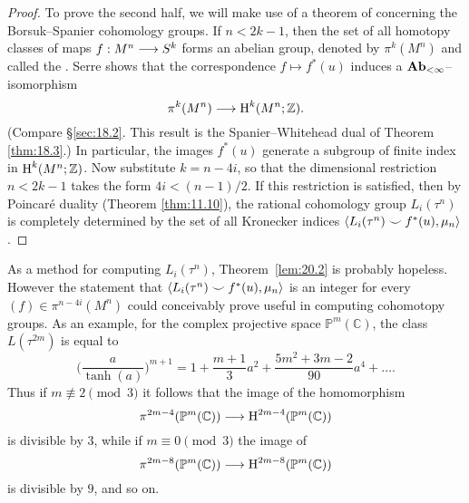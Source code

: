 \documentclass[../main]{subfiles}
\begin{document}
\begin{proof}
To prove the second half, we will make use of a theorem of \cite[p. 289]{serre} concerning the Borsuk--Spanier cohomology groups. If $n < 2 k - 1$, then the set of all homotopy classes of maps $f : M^n \longrightarrow S^k$ forms an abelian group, denoted by $\pi^k(M^n)$ and called the . Serre shows that the correspondence $f \mapsto f^\ast(u)$ induces a $\mathbf{Ab}_{<\infty}$--isomorphism \[\pi^k(M^n) \longrightarrow \operatorname{H}^k(M^n; \mathbb Z).\] (Compare \S\ref{sec:18.2}. This result is the Spanier--Whitehead dual of Theorem \ref{thm:18.3}.) In particular, the images $f^\ast(u)$ generate a subgroup of finite index in $\operatorname{H}^k(M^n; \mathbb Z)$. Now substitute $k = n - 4i$, so that the dimensional restriction $n < 2 k - 1$ takes the form $4 i < (n - 1)/2$. If this restriction is satisfied, then by Poincar\'e duality (Theorem \ref{thm:11.10}), the rational cohomology group $L_i(\tau^n)$ is completely determined by the set of all Kronecker indices $\langle L_i(\tau^n) \smile f^\ast(u),\mu_n\rangle$.
\end{proof}

\begin{remark*}
As a method for computing $L_i(\tau^n)$, Theorem~\ref{lem:20.2} is probably hopeless. However the statement that $\langle L_i(\tau^n) \smile f^\ast(u),\mu_n\rangle$ is an integer for every\newline $(f) \in \pi^{n - 4i}(M^n)$ could conceivably prove useful in computing cohomotopy groups. As an example, for the complex projective space ${\mathbb P}^m(\mathbb C)$, the class $L(\tau^{2m})$ is equal to \[\biggl(\dfrac{a}{\tanh(a)}\biggr)^{m + 1} = 1 + \frac {m + 1} 3 a^2 + \frac {5m^2 + 3m - 2} {90} a^4 + \ldots.\] Thus if $m \not \equiv 2 \pmod 3$ it follows that the image of the homomorphism \[\pi^{2m - 4}({\mathbb P}^m(\mathbb C)) \longrightarrow \operatorname{H}^{2m - 4}({\mathbb P}^m(\mathbb C))\] is divisible by $3$, while if $m \equiv 0 \pmod 3$ the image of \[\pi^{2m - 8}({\mathbb P}^m(\mathbb C)) \longrightarrow \operatorname{H}^{2m - 8}({\mathbb P}^m(\mathbb C))\] is divisible by $9$, and so on. 
\end{remark*} 
\end{document}
